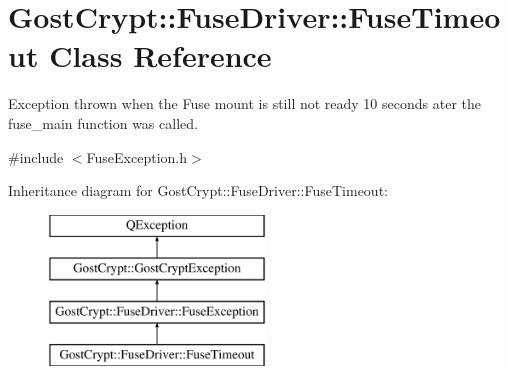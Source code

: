 \hypertarget{class_gost_crypt_1_1_fuse_driver_1_1_fuse_timeout}{}\section{Gost\+Crypt\+:\+:Fuse\+Driver\+:\+:Fuse\+Timeout Class Reference}
\label{class_gost_crypt_1_1_fuse_driver_1_1_fuse_timeout}


Exception thrown when the Fuse mount is still not ready 10 seconds ater the fuse\+\_\+main function was called.  




{\ttfamily \#include $<$Fuse\+Exception.\+h$>$}

Inheritance diagram for Gost\+Crypt\+:\+:Fuse\+Driver\+:\+:Fuse\+Timeout\+:\begin{figure}[H]
\begin{center}
\leavevmode
\includegraphics[height=4.000000cm]{class_gost_crypt_1_1_fuse_driver_1_1_fuse_timeout}
\end{center}
\end{figure}
